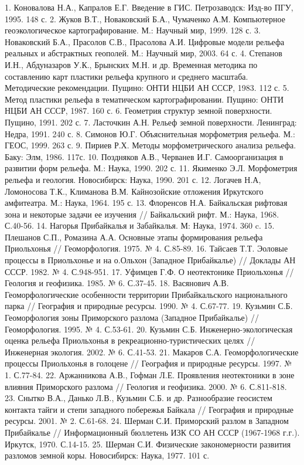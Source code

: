 \documentclass[runningheads]{AIIT}
\begin{document}
1. Коновалова Н.А., Капралов Е.Г. Введение в ГИС. Петрозаводск: Изд-во ПГУ, 1995. 148 с.
2. Жуков В.Т., Новаковский Б.А., Чумаченко А.М. Компьютерное геоэкологическое картографирование. М.: Научный мир, 1999. 128 с.
3. Новаковский Б.А., Прасолов С.В., Прасолова А.И. Цифровые модели рельефа реальных и абстрактных геополей. М.: Научный мир, 2003. 64 с.
4. Степанов И.Н., Абдуназаров У.К., Брынских М.Н. и др. Временная методика по составлению карт пластики рельефа крупного и среднего масштаба. Методические рекомендации. Пущино: ОНТИ НЦБИ АН СССР, 1983. 112 с.
5. Метод пластики рельефа в тематическом картографировании. Пущино: ОНТИ НЦБИ АН СССР, 1987. 160 с.
6. Геометрия структур земной поверхности. Пущино, 1991. 202 с.
7. Ласточкин А.Н. Рельеф земной поверхности. Ленинград: Недра, 1991. 240 с.
8. Симонов Ю.Г. Объяснительная морфометрия рельефа. М.: ГЕОС, 1999. 263 с.
9. Пириев Р.Х. Методы морфометрического анализа рельефа. Баку: Элм, 1986. 117с.
10. Поздняков А.В., Черванев И.Г. Самоорганизация в развитии форм рельефа. М.: Наука, 1990. 202 с.
11. Якименко Э.Л. Морфометрия рельефа и геология. Новосибирск: Наука, 1990. 201 с.
12. Логачев Н.А, Ломоносова Т.К., Климанова В.М. Кайнозойские отложения Иркутского амфитеатра. М.: Наука, 1964. 195 с.
13. Флоренсов Н.А. Байкальская рифтовая зона и некоторые задачи ее изучения // Байкальский рифт. М.: Наука, 1968. С.40-56.
14. Нагорья Прибайкалья и Забайкалья. М: Наука, 1974. 360 c.
15. Плешанов С.П., Ромазина А.А. Основные этапы формирования рельефа Приольхонья // Геоморфология. 1975. № 4. С.85-89.
16. Тайсаев Т.Т. Эоловые процессы в Приольхонье и на о.Ольхон (Западное Прибайкалье) //  Доклады АН СССР. 1982. № 4. С.948-951.
17. Уфимцев Г.Ф. О неотектонике Приольхонья // Геология и геофизика. 1985. № 6. С.37-45.
18. Васянович А.В. Геоморфологические особенности территории Прибайкальского национального парка // География и природные ресурсы. 1990. № 4. С.67-77.
19. Кузьмин С.Б. Геоморфология зоны Приморского разлома (Западное Прибайкалье) // Геоморфология. 1995. № 4. С.53-61.
20. Кузьмин С.Б. Инженерно-экологическая оценка рельефа Приольхонья в рекреационно-туристических целях // Инженерная экология. 2002. № 6. С.41-53.
21. Макаров С.А. Геоморфологические процессы Приольхонья в голоцене // География и природные ресурсы. 1997. № 1. С.77-84.
22. Аржанникова А.В., Гофман Л.Е. Проявления неотектоники в зоне влияния Приморского разлома // Геология и геофизика. 2000. № 6. С.811-818.
23. Снытко В.А., Данько Л.В., Кузьмин С.Б. и др. Разнообразие геосистем контакта тайги и степи западного побережья Байкала // География и природные ресурсы. 2001. № 2. С.61-68.
24. Шерман С.И. Приморский разлом в Западном Прибайкалье // Информационный бюллетень ИЗК СО АН СССР (1967-1968 г.г.). Иркутск, 1970. С.14-15.
25. Шерман С.И. Физические закономерности развития разломов земной коры. Новосибирск: Наука, 1977. 101 с.
\end{document}
